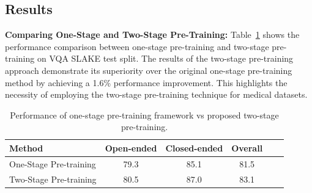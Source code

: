 \subsection{Results}\label{result1}

{\bf Comparing One-Stage and Two-Stage Pre-Training:} Table~\ref{tab:compareTwoStage} shows the performance comparison between one-stage pre-training and two-stage pre-training on VQA SLAKE test split. The results of the two-stage pre-training approach demonstrate its superiority over the original one-stage pre-training method by achieving a 1.6\% performance improvement. This highlights the necessity of employing the two-stage pre-training technique for medical datasets. 

\begin{table}[h]
    \centering
    \caption{Performance of one-stage pre-training framework vs proposed two-stage pre-training.}
    \setlength{\tabcolsep}{3.pt}
    \begin{tabular}{l c  c c c  c}
        \toprule
        Method &  Open-ended & Closed-ended & Overall  \\
        \midrule
        One-Stage Pre-training \cite{Dou_2022_CVPR}  & 79.3 & 85.1 & 81.5 \\
        \rowcolor{LightCyan}
        Two-Stage Pre-training & 80.5 & 87.0 & 83.1 \\
        \bottomrule
    \end{tabular}
    \label{tab:compareTwoStage}
\end{table}


